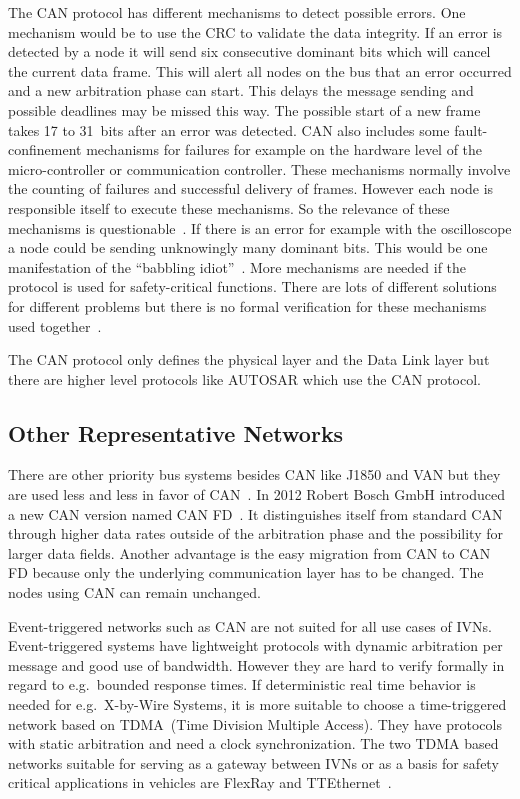 The CAN protocol has different mechanisms to detect possible errors. One
mechanism would be to use the CRC to validate the data integrity. If an error is
detected by a node it will send six consecutive dominant bits which will cancel
the current data frame. This will alert all nodes on the bus that an error
occurred and a new arbitration phase can start. This delays the message sending
and possible deadlines may be missed this way. The possible start of a new frame
takes 17 to 31~bits after an error was detected. CAN also includes some
fault-confinement mechanisms for failures for example on the hardware level of
the micro-controller or communication controller. These mechanisms normally
involve the counting of failures and successful delivery of frames. However each
node is responsible itself to execute these mechanisms. So the relevance of
these mechanisms is questionable~\cite{Navet2017}. If there is an error for
example with the oscilloscope a node could be sending unknowingly many dominant
bits. This would be one manifestation of the ``babbling
idiot''~\cite{Pimentel2009}. More mechanisms are needed if the protocol is used
for safety-critical functions. There are lots of different solutions for
different problems but there is no formal verification for these mechanisms used
together~\cite{Navet2017}.

The CAN protocol only defines the physical layer and the Data Link layer but
there are higher level protocols like AUTOSAR which use the CAN protocol.

\subsection{Other Representative Networks}

There are other priority bus systems besides CAN like J1850 and VAN but they are
used less and less in favor of CAN~\cite{Navet2017}. In 2012 Robert Bosch GmbH
introduced a new CAN version named CAN FD~\cite{Hartwich2012}. It distinguishes
itself from standard CAN through higher data rates outside of the arbitration
phase and the possibility for larger data fields. Another advantage is the easy
migration from CAN to CAN FD because only the underlying communication layer has
to be changed. The nodes using CAN can remain unchanged.

Event-triggered networks such as CAN are not suited for all use cases of IVNs.
Event-triggered systems have lightweight protocols with dynamic arbitration per
message and good use of bandwidth. However they are hard to verify formally in
regard to e.g.\ bounded response times. If deterministic real time behavior is
needed for e.g.\ X-by-Wire Systems, it is more suitable to choose a
time-triggered network based on TDMA~(Time Division Multiple Access). They have
protocols with static arbitration and need a clock synchronization. The two TDMA
based networks suitable for serving as a gateway between IVNs or as a basis for
safety critical applications in vehicles are FlexRay and
TTEthernet~\cite{Navet2017}. 

